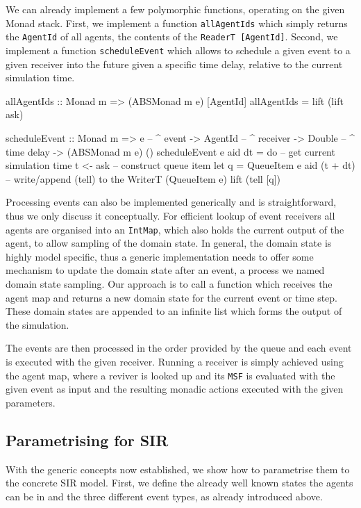 We can already implement a few polymorphic functions, operating on the given Monad stack. First, we implement a function \texttt{allAgentIds} which simply returns the \texttt{AgentId} of all agents, the contents of the \texttt{ReaderT [AgentId]}. Second, we implement a function \texttt{scheduleEvent} which allows to schedule a given event to a given receiver into the future given a specific time delay, relative to the current simulation time.
 
\begin{HaskellCode}
allAgentIds :: Monad m => (ABSMonad m e) [AgentId]
allAgentIds = lift (lift ask)

scheduleEvent :: Monad m
              => e        -- ^ event
              -> AgentId  -- ^ receiver
              -> Double   -- ^ time delay
              -> (ABSMonad m e) ()
scheduleEvent e aid dt = do
  -- get current simulation time
  t <- ask
  -- construct queue item
  let q = QueueItem e aid (t + dt)
  -- write/append (tell) to the WriterT (QueueItem e)
  lift (tell [q])
\end{HaskellCode}

Processing events can also be implemented generically and is straightforward, thus we only discuss it conceptually. For efficient lookup of event receivers all agents are organised into an \texttt{IntMap}, which also holds the current output of the agent, to allow sampling of the domain state. In general, the domain state is highly model specific, thus a generic implementation needs to offer some mechanism to update the domain state after an event, a process we named domain state sampling. Our approach is to call a function which receives the agent map and returns a new domain state for the current event or time step. These domain states are appended to an infinite list which forms the output of the simulation.

The events are then processed in the order provided by the queue and each event is executed with the given receiver. Running a receiver is simply achieved using the agent map, where a reviver is looked up and its \texttt{MSF} is evaluated with the given event as input and the resulting monadic actions executed with the given parameters.
 
\subsection{Parametrising for SIR}
With the generic concepts now established, we show how to parametrise them to the concrete SIR model. First, we define the already well known states the agents can be in and the three different event types, as already introduced above.

